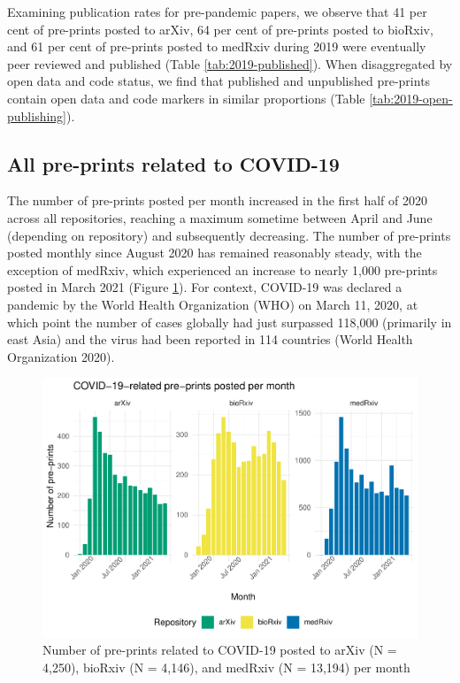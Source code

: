 \documentclass[
]{article}
\begin{document}
Examining publication rates for pre-pandemic papers, we observe that 41 per cent of pre-prints posted to arXiv, 64 per cent of pre-prints posted to bioRxiv, and 61 per cent of pre-prints posted to medRxiv during 2019 were eventually peer reviewed and published (Table \ref{tab:2019-published}). When disaggregated by open data and code status, we find that published and unpublished pre-prints contain open data and code markers in similar proportions (Table \ref{tab:2019-open-publishing}).

\hypertarget{all-pre-prints-related-to-covid-19}{%
\subsection{All pre-prints related to COVID-19}\label{all-pre-prints-related-to-covid-19}}

The number of pre-prints posted per month increased in the first half of 2020 across all repositories, reaching a maximum sometime between April and June (depending on repository) and subsequently decreasing. The number of pre-prints posted monthly since August 2020 has remained reasonably steady, with the exception of medRxiv, which experienced an increase to nearly 1,000 pre-prints posted in March 2021 (Figure \ref{fig:monthly-papers-total}). For context, COVID-19 was declared a pandemic by the World Health Organization (WHO) on March 11, 2020, at which point the number of cases globally had just surpassed 118,000 (primarily in east Asia) and the virus had been reported in 114 countries (World Health Organization 2020).

\begin{figure}[H]

{\centering \includegraphics[width=0.9\linewidth]{paper_files/figure-latex/monthly-papers-total-1} 

}

\caption{Number of pre-prints related to COVID-19 posted to arXiv (N = 4,250), bioRxiv (N = 4,146), and medRxiv (N = 13,194) per month}\label{fig:monthly-papers-total}
\end{figure}
\end{document}
